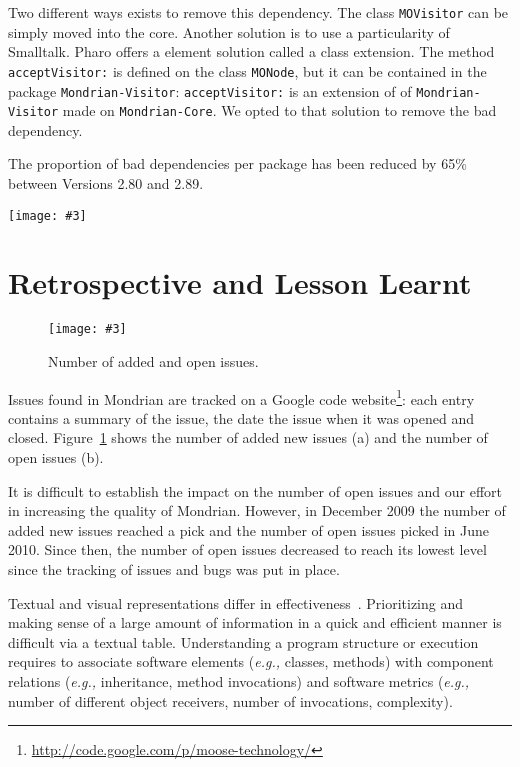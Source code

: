 \documentclass[runningheads]{llncs}
\newcommand{\ct}{\lstinline[backgroundcolor=\color{white},basicstyle=\footnotesize\ttfamily]}
\newcommand{\fig}[4]{
	\begin{figure}[#1]
		\centering
		\texttt{[image: \#3]}
		\caption{\label{fig:#3}#4}
	\end{figure}}
\newcommand{\largefig}[4]{
	\begin{figure*}[#1]
		\centering
		\texttt{[image: \#3]}
		\caption{\label{fig:#3}#4}
	\end{figure*}}
\newcommand{\eg}{\emph{e.g.,}\xspace}
\newcommand{\seclabel}[1]{\label{sec:#1}}
\newcommand{\figref}[1]{Figure~\ref{fig:#1}}
\begin{document}
Two different ways exists to remove this dependency. The class \ct{MOVisitor} can be simply moved into the core. Another solution is to use a particularity of Smalltalk. Pharo offers a element solution called a class extension. The method \ct{acceptVisitor:} is defined on the class \ct{MONode}, but it can be contained in the package \ct{Mondrian-Visitor}: \ct{acceptVisitor:} is an extension of of \ct{Mondrian-Visitor} made on \ct{Mondrian-Core}. We opted to that solution to remove the bad dependency.

The proportion of bad dependencies per package has been reduced by 65\% between Versions 2.80 and 2.89.

\largefig{}{1.23}{DependencyBlueprint}{Evolution of Mondrian dependencies.}

\section{Retrospective and Lesson Learnt} \seclabel{lessonLearnt}

\fig{}{0.9}{Retrospective}{Number of added and open issues.}

Issues found in Mondrian are tracked on a Google code website\footnote{\url{http://code.google.com/p/moose-technology/}}: each entry contains a summary of the issue, the date the issue when it was opened and closed.
\figref{Retrospective} shows the number of added new issues (a) and the number of open issues (b).  

It is difficult to establish the impact on the number of open issues and our effort in increasing the quality of Mondrian. However, in December 2009 the number of added new issues reached a pick and the number of open issues picked in June 2010. Since then, the number of open issues decreased to reach its lowest level since the tracking of issues and bugs was put in place.

Textual and visual representations differ in effectiveness~\cite{Petr95a}. 
Prioritizing and making sense of a large amount of information in a quick and efficient manner is difficult via a textual table. Understanding a program structure or execution requires to associate software elements (\eg classes, methods) with component relations (\eg inheritance, method invocations) and software metrics (\eg number of different object receivers, number of invocations, complexity). 
\end{document}
